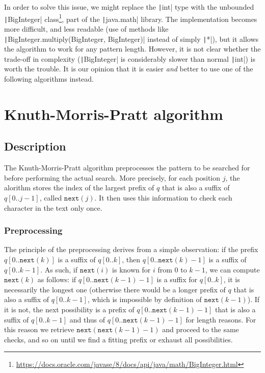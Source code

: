 \documentclass[a4paper,11pt,openany,extrafontsizes,twoside,article]{memoir}
\begin{document}
In order to solve this issue, we might replace the
\texttt|int| type with the unbounded
\texttt|BigInteger|
class\footnote{\url{https://docs.oracle.com/javase/8/docs/api/java/math/BigInteger.html}},
part of the \texttt|java.math| library. The implementation
becomes more difficult, and less readable (use of methods like
\texttt|BigInteger.multiply(BigInteger, BigInteger)| instead
of simply \texttt|*|), but it allows the algorithm to work
for any pattern length. However, it is not clear whether the trade-off
in complexity (\texttt|BigInteger| is considerably slower
than normal \texttt|int|) is worth the trouble. It is our
opinion that it is easier \emph{and} better to use one of the
following algorithms instead.

\chapter{Knuth-Morris-Pratt algorithm}
\label{cha:knuth-morris-pratt}

\section{Description}
\label{sec:description-3}

The Knuth-Morris-Pratt algorithm preprocesses the pattern to be
searched for before performing the actual search. More precisely, for
each position $j$, the alorithm stores the index of the largest prefix
of $q$ that is also a suffix of $q[0..j-1]$, called
$\mathtt{next}(j)$. It then uses this information to check each
character in the text only once.

\subsection{Preprocessing}
\label{sec:preprocessing}

The principle of the preprocessing derives from a simple observation:
if the prefix $q[0..\mathtt{next}(k)]$ is a suffix of $q[0..k]$, then
$q[0..\mathtt{next}(k)-1]$ is a suffix of $q[0..k-1]$. As such, if
$\mathtt{next}(i)$ is known for $i$ from $0$ to $k-1$, we can compute
$\mathtt{next}(k)$ as follows: if $q[0..\mathtt{next}(k-1)-1]$ is a
suffix for $q[0..k]$, it is necessarily the longest one (otherwise
there would be a longer prefix of $q$ that is also a suffix of
$q[0..k-1]$, which is impossible by definition of
$\mathtt{next}(k-1)$). If it is not, the next possibility is a prefix
of $q[0..\mathtt{next}(k-1)-1]$ that is also a suffix of $q[0..k-1]$
and thus of $q[0..\mathtt{next}(k-1)-1]$ for length reasons. For this
reason we retrieve $\mathtt{next}(\mathtt{next}(k-1)-1)$ and proceed
to the same checks, and so on until we find a fitting prefix or
exhaust all possibilities.
\end{document}
